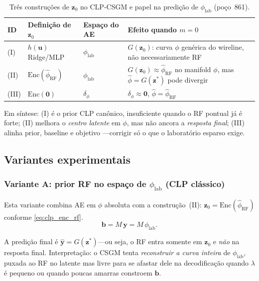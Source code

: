 \documentclass[11pt,a4paper]{article}
\newcommand{\philab}{\ensuremath{\phi_{\mathrm{lab}}}}
\newcommand{\deltaphi}{\ensuremath{\delta_{\phi}}}
\newcommand{\zvec}{\ensuremath{\mathbf{z}}}
\newcommand{\zzero}{\ensuremath{\mathbf{z}_0}}
\begin{document}
\begin{table}[H]
  \centering
  \caption{Três construções de $\zzero$ no CLP-CSGM e papel na predição
           de \philab{} (poço~861).}
  \label{tab:clp_z0_roles}
  \small
  \begin{tabular}{p{2.2cm}p{3.8cm}p{4.2cm}p{3.8cm}}
    \toprule
    ID & Definição de $\zzero$ & Espaço do AE & Efeito quando $m=0$ \\
    \midrule
    (I) &
      $h(\mathbf{u})$ Ridge/MLP &
      $\phi_{\mathrm{lab}}$ &
      $G(\zzero)$: curva $\phi$ genérica do wireline, não necessariamente RF \\
    (II) &
      $\mathrm{Enc}(\widehat{\phi}_{\mathrm{RF}})$ &
      $\phi_{\mathrm{lab}}$ &
      $G(\zzero)\approx\widehat{\phi}_{\mathrm{RF}}$ no manifold $\phi$,
      mas $\widehat{\phi}=G(\zvec^{\ast})$ pode divergir \\
    (III) &
      $\mathrm{Enc}(\mathbf{0})$ &
      $\deltaphi$ &
      $\widehat{\deltaphi}\approx\mathbf{0}$,
      $\widehat{\phi}=\widehat{\phi}_{\mathrm{RF}}$ \\
    \bottomrule
  \end{tabular}
\end{table}

Em síntese: (I) é o prior CLP canônico, insuficiente quando o RF pontual
já é forte; (II) melhora o \emph{centro latente} em $\phi$, mas não
ancora a \emph{resposta final}; (III) alinha prior, baseline e objetivo
---corrigir só o que o laboratório esparso exige.

\subsection{Variantes experimentais}
\label{sec:clp_variants}

\subsubsection{Variante A: prior RF no espaço de \philab{} (CLP clássico)}

Esta variante combina AE em $\phi$ absoluta com a construção~(II):
$\zzero=\mathrm{Enc}(\widehat{\phi}_{\mathrm{RF}})$ conforme
\eqref{eq:clp_enc_rf}.
\begin{equation}
  \mathbf{b}
  =
  M\,\mathbf{y}
  =
  M\,\phi_{\mathrm{lab}}.
  \label{eq:clp_b_abs}
\end{equation}

A predição final é $\widehat{\mathbf{y}}=G(\zvec^{\ast})$---ou seja, o
RF entra somente em $\zzero$ e \emph{não} na resposta final.
Interpretação: o CSGM tenta \emph{reconstruir a curva inteira} de
\philab{}, puxada ao RF no latente mas livre para se afastar dele na
decodificação quando $\lambda$ é pequeno ou quando poucas amarras
constroem $\mathbf{b}$.
\end{document}
